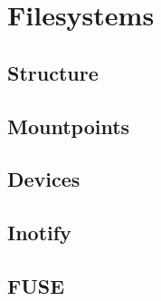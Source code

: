 \section{Filesystems}

\subsection{Structure}

\subsection{Mountpoints}

\subsection{Devices}

\subsection{Inotify}

\subsection{FUSE}

